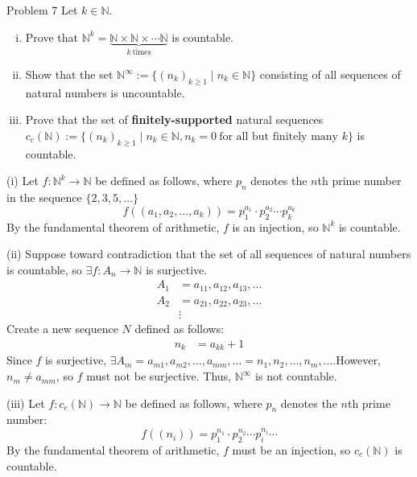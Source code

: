 \documentclass[10pt]{extarticle}
\begin{document}
  \begin{problem}{Problem 7}
    Let $k\in\mathbb{N}$.
    \begin{enumerate}[(i)]
      \item Prove that $\mathbb{N}^k = \underbrace{\mathbb{N}\times\mathbb{N}\times\cdots\mathbb{N}}_{k~\textrm{times}}$ is countable.
      \item Show that the set $\mathbb{N}^{\infty} := \{(n_k)_{k\geq 1}\mid n_k\in \mathbb{N}\}$ consisting of all sequences of natural numbers is uncountable.
      \item Prove that the set of \textbf{finitely-supported} natural sequences $c_c(\mathbb{N}) := \{(n_k)_{k\geq 1} \mid n_k\in\mathbb{N}, n_k=0~\text{for all but finitely many }k\}$ is countable.
    \end{enumerate}
    \tcblower
    \begin{problem}{(i)}
      Let $f: \mathbb{N}^k \rightarrow \mathbb{N}$ be defined as follows, where $p_n$ denotes the $n$th prime number in the sequence $\{2,3,5,\dots\}$
      \[
        f((a_1,a_2,\dots,a_k)) = p_1^{a_1}\cdot p_2^{a_2}\cdots p_k^{a_k}
      \] 
      By the fundamental theorem of arithmetic, $f$ is an injection, so $\mathbb{N}^k$ is countable.
    \end{problem}
    \begin{problem}{(ii)}
      Suppose toward contradiction that the set of all sequences of natural numbers is countable, so $\exists f:A_n \rightarrow \mathbb{N}$ is surjective.
      \begin{align*}
        A_1 &= a_{11},a_{12},a_{13},\dots\\
        A_2 &= a_{21},a_{22},a_{23},\dots\\
            &\vdots
      \end{align*}
      Create a new sequence $N$ defined as follows:
      \begin{align*}
        n_{k} &= a_{kk} + 1
      \end{align*}
      Since $f$ is surjective, $\exists A_m = a_{m1},a_{m2},\dots,a_{mm},\dots = n_{1},n_{2},\dots,n_{m},\dots$.However, $n_m \neq a_{mm}$, so $f$ must not be surjective. Thus, $\mathbb{N}^{\infty}$ is not countable.
    \end{problem}
    \begin{problem}{(iii)}
      Let $f: c_c(\mathbb{N}) \rightarrow \mathbb{N}$ be defined as follows, where $p_n$ denotes the $n$th prime number:
      \[
        f((n_i)) = p_1^{n_1}\cdot p_2^{n_2}\cdots p_{i}^{n_i}\cdots
      \] 
      By the fundamental theorem of arithmetic, $f$ must be an injection, so $c_c(\mathbb{N})$ is countable.

\end{problem}
\end{problem}
\end{document}
